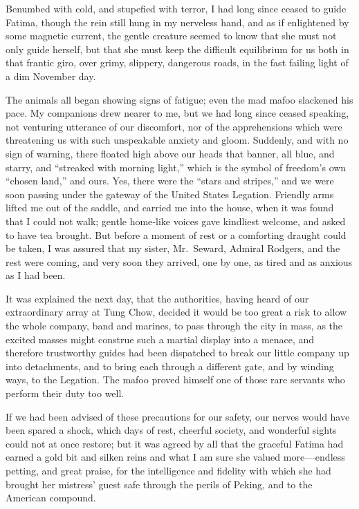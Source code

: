 \documentclass[12pt]{book}
\begin{document}
Benumbed with cold, and stupefied with terror, I had long since ceased to guide
Fatima, though the rein still hung in my nerveless hand, and as if enlightened by
some magnetic current, the gentle creature seemed to know that she must not
only guide herself, but that she must keep the difficult equilibrium for us both in
that frantic giro, over grimy, slippery, dangerous roads, in the fast failing light of
a dim November day.

The animals all began showing signs of fatigue; even the mad mafoo slackened
his pace. My companions drew nearer to me, but we had long since ceased
speaking, not venturing utterance of our discomfort, nor of the apprehensions
which were threatening us with such unspeakable anxiety and gloom. Suddenly,
and with no sign of warning, there floated high above our heads that banner,
all blue, and starry, and “streaked with morning light,” which is the symbol of
freedom’s own “chosen land,” and ours. Yes, there were the “stars and stripes,” and
we were soon passing under the gateway of the United States Legation. Friendly
arms lifted me out of the saddle, and carried me into the house, when it was found
that I could not walk; gentle home‐like voices gave kindliest welcome, and asked
to have tea brought. But before a moment of rest or a comforting draught could
be taken, I was assured that my sister, Mr.~Seward, Admiral Rodgers, and the rest
were coming, and very soon they arrived, one by one, as tired and as anxious as I
had been.

It was explained the next day, that the authorities, having heard of our extraordinary array at Tung Chow, decided it would be too great a risk to allow
the whole company, band and marines, to pass through the city in mass, as the
excited masses might construe such a martial display into a menace, and therefore trustworthy guides had been dispatched to break our little company up into
detachments, and to bring each through a different gate, and by winding ways, to
the Legation. The mafoo proved himself one of those rare servants who perform
their duty too well.

If we had been advised of these precautions for our safety, our nerves would
have been spared a shock, which days of rest, cheerful society, and wonderful
sights could not at once restore; but it was agreed by all that the graceful Fatima
had earned a gold bit and silken reins and what I am sure she valued more — endless
petting, and great praise, for the intelligence and fidelity with which she had
brought her mistress’ guest safe through the perils of Peking, and to the American
compound.
\end{document}

